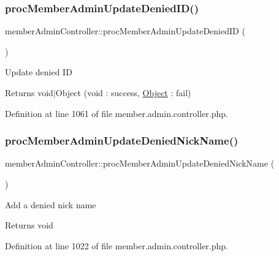\mbox{\label{classmemberAdminController_a469f2b07b7c5adffc62c9dbf71680d32}} 
\subsubsection{\texorpdfstring{proc\+Member\+Admin\+Update\+Denied\+I\+D()}{procMemberAdminUpdateDeniedID()}}
{\footnotesize\ttfamily member\+Admin\+Controller\+::proc\+Member\+Admin\+Update\+Denied\+ID (\begin{DoxyParamCaption}{ }\end{DoxyParamCaption})}

Update denied ID \begin{DoxyReturn}{Returns}
void$\vert$\+Object (void \+: success, \hyperlink{classObject}{Object} \+: fail) 
\end{DoxyReturn}


Definition at line 1061 of file member.\+admin.\+controller.\+php.

\mbox{\label{classmemberAdminController_aa24edd8acdc15ea463a721b0dd3afe45}} 
\subsubsection{\texorpdfstring{proc\+Member\+Admin\+Update\+Denied\+Nick\+Name()}{procMemberAdminUpdateDeniedNickName()}}
{\footnotesize\ttfamily member\+Admin\+Controller\+::proc\+Member\+Admin\+Update\+Denied\+Nick\+Name (\begin{DoxyParamCaption}{ }\end{DoxyParamCaption})}

Add a denied nick name \begin{DoxyReturn}{Returns}
void 
\end{DoxyReturn}


Definition at line 1022 of file member.\+admin.\+controller.\+php.

